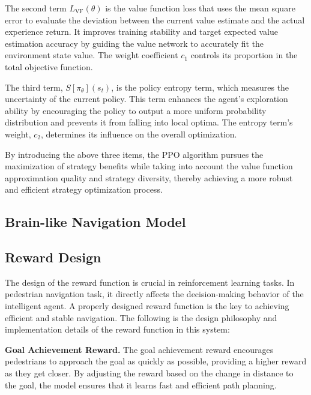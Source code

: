 \documentclass[lettersize,journal]{IEEEtran}
\begin{document}
The second term $L_{\text{VF}}(\theta)$ is the value function loss that uses the mean square error to evaluate the deviation between the current value estimate and the actual experience return. 
It improves training stability and target expected value estimation accuracy by guiding the value network to accurately fit the environment state value. 
The weight coefficient $c_1$ controls its proportion in the total objective function.


The third term, $S[\pi_{\theta}](s_t)$, is the policy entropy term, which measures the uncertainty of the current policy. 
This term enhances the agent's exploration ability by encouraging the policy to output a more uniform probability distribution and prevents it from falling into local optima. 
The entropy term's weight, $c_2$, determines its influence on the overall optimization.


By introducing the above three items, the PPO algorithm pursues the maximization of strategy benefits while taking into account the value function approximation quality and strategy diversity, thereby achieving a more robust and efficient strategy optimization process.






\subsection{Brain-like Navigation Model}


\subsection{Reward Design} \label{sec:reward}

The design of the reward function is crucial in reinforcement learning tasks. 
In pedestrian navigation task, it directly affects the decision-making behavior of the intelligent agent. A properly designed reward function is the key to achieving efficient and stable navigation. The following is the design philosophy and implementation details of the reward function in this system:


\textbf{Goal Achievement Reward.}
The goal achievement reward encourages pedestrians to approach the goal as quickly as possible, providing a higher reward as they get closer. 
By adjusting the reward based on the change in distance to the goal, the model ensures that it learns fast and efficient path planning.
\end{document}
